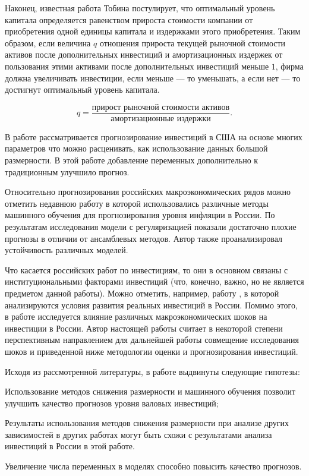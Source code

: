 Наконец, известная работа Тобина \cite{tobin1969general} постулирует, что оптимальный уровень капитала определяется равенством прироста стоимости компании от приобретения одной единицы капитала и издержками этого приобретения. Таким образом, если величина $q$ отношения прироста текущей рыночной стоимости активов после дополнительных инвестиций и амортизационных издержек от пользования этими активами после дополнительных инвестиций меньше $1$, фирма должна увеличивать инвестиции, если меньше --- то уменьшать, а если нет --- то достигнут оптимальный уровень капитала.

\begin{equation}
    q = \frac{\text{прирост рыночной стоимости активов}}{\text{амортизационные издержки}}.
\end{equation}

В работе \cite{rapachforecasting} рассматривается прогнозирование инвестиций в США на основе многих параметров что можно расценивать, как использование данных большой размерности. В этой работе добавление переменных дополнительно к традиционным улучшило прогноз.

 Относительно прогнозирования российских макроэкономических рядов можно отметить недавнюю работу \cite{baybuza2018inflation}
 в которой использовались различные методы машинного обучения для прогнозирования уровня инфляции в России. По результатам исследования модели с регуляризацией показали достаточно плохие прогнозы в отличии от ансамблевых методов. Автор также проанализировал устойчивость различных моделей.
 
 Что касается российских работ по инвестициям, то они в основном связаны с институциональными факторами инвестиций (что, конечно, важно, но не является предметом данной работы). Можно отметить, например, работу \cite{фирсов2014условия}, в которой анализируются условия развития реальных инвестиций в России. Помимо этого, в работе \cite{шоломицкая2017влияние} исследуется влияние различных макроэкономических шоков на инвестиции в России. Автор настоящей работы считает в некоторой степени перспективным направлением для дальнейшей работы совмещение исследования шоков и приведенной ниже методологии оценки и прогнозирования инвестиций.
 
 Исходя из рассмотренной литературы, в работе выдвинуты следующие гипотезы:
 
 \begin{Enumerate}
	\item Использование методов снижения размерности и машинного обучения позволит улучшить качество прогнозов уровня валовых инвестиций;
	\item Результаты использования методов снижения размерности при анализе других зависимостей в других работах могут быть схожи с результатами анализа инвестиций в России в этой работе.
	\item Увеличение числа переменных в моделях способно повысить качество прогнозов.
	 \end{Enumerate}
 
